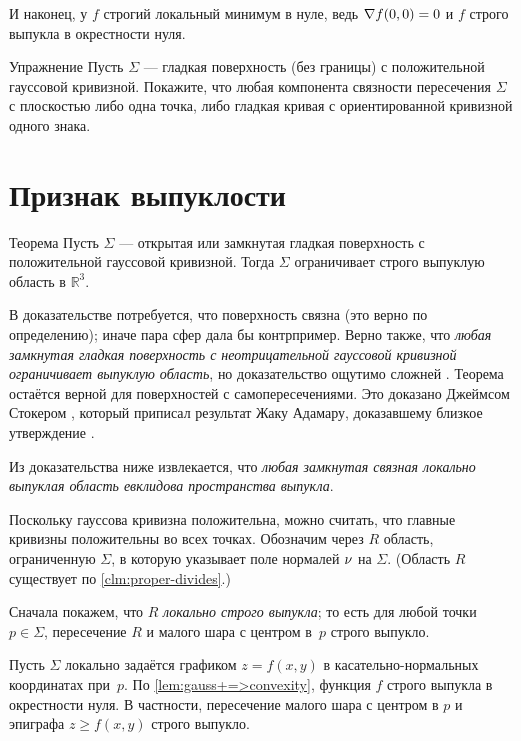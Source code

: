 И наконец, у $f$ строгий локальный минимум в нуле,
ведь $\nabla f(0,0)\z=0$ и $f$ строго выпукла в окрестности нуля.
\qeds


\begin{thm}{Упражнение}\label{ex:section-of-convex}
Пусть $\Sigma$ --- гладкая поверхность (без границы) с положительной гауссовой кривизной.
Покажите, что любая компонента связности пересечения $\Sigma$ с плоскостью либо одна точка, либо гладкая кривая с ориентированной кривизной одного знака.
\end{thm}

\section{Признак выпуклости}

\begin{thm}{Теорема}\label{thm:convex-embedded}
Пусть $\Sigma$ --- открытая или замкнутая гладкая поверхность с положительной гауссовой кривизной.
Тогда $\Sigma$ ограничивает строго выпуклую область в $\mathbb{R}^3$.
\end{thm}

В доказательстве потребуется, что поверхность связна (это верно по определению);
иначе пара сфер дала бы контрпример.
Верно также, что \textit{любая замкнутая гладкая поверхность с неотрицательной гауссовой кривизной ограничивает выпуклую область},
но доказательство ощутимо сложней \cite{hadamard,gomes,sacksteder}.
Теорема остаётся верной для поверхностей с самопересечениями. 
Это доказано Джеймсом Стокером \cite{stoker}, который приписал результат Жаку Адамару, доказавшему близкое утверждение \cite[§ 23]{hadamard}.

Из доказательства ниже извлекается, что \textit{любая замкнутая связная локально выпуклая область евклидова пространства выпукла}.


Поскольку гауссова кривизна положительна, можно считать, что главные кривизны положительны во всех точках.
Обозначим через $R$ область, ограниченную $\Sigma$, в которую указывает поле нормалей $\nu$ на $\Sigma$.
(Область $R$ существует по \ref{clm:proper-divides}.)

Сначала покажем, что $R$ {}\emph{локально строго выпукла};
то есть для любой точки $p\in \Sigma$, пересечение $R$ и малого шара с центром в~$p$ строго выпукло.

Пусть $\Sigma$ локально задаётся графиком $z=f(x,y)$ в касательно-нормальных координатах при~$p$.
По \ref{lem:gauss+=>convexity}, функция $f$ строго выпукла в окрестности нуля.
В частности, пересечение малого шара с центром в $p$ и эпиграфа $z\ge f(x,y)$ строго выпукло.

